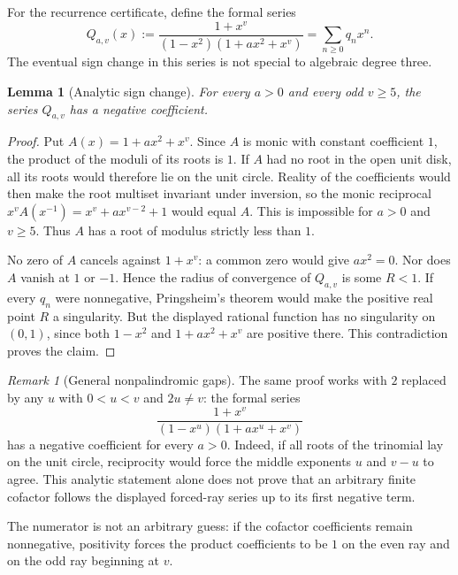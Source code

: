 \documentclass[11pt]{article}
\newtheorem{lemma}[theorem]{Lemma}
\theoremstyle{remark}
\newtheorem{remark}[theorem]{Remark}
\numberwithin{equation}{section}
\begin{document}
For the recurrence certificate, define the formal series
\begin{equation}\label{eq:forcedseries}
 Q_{a,v}(x):=\frac{1+x^v}{(1-x^2)(1+a x^2+x^v)}
             =\sum_{n\ge0}q_nx^n.
\end{equation}
The eventual sign change in this series is not special to algebraic degree
three.
\begin{lemma}[Analytic sign change]\label{lem:pringsheim}
For every $a>0$ and every odd $v\ge5$, the series $Q_{a,v}$ has a negative
coefficient.
\end{lemma}
\begin{proof}
Put $A(x)=1+ax^2+x^v$.  Since $A$ is monic with constant coefficient $1$,
the product of the moduli of its roots is $1$.  If $A$ had no root in the open
unit disk, all its roots would therefore lie on the unit circle.  Reality of
the coefficients would then make the root multiset invariant under inversion,
so the monic reciprocal $x^vA(x^{-1})=x^v+ax^{v-2}+1$ would equal $A$.
This is impossible for $a>0$ and $v\ge5$.  Thus $A$ has a root of modulus
strictly less than $1$.

No zero of $A$ cancels against $1+x^v$: a common zero would give $ax^2=0$.
Nor does $A$ vanish at $1$ or $-1$.  Hence the radius of convergence of
$Q_{a,v}$ is some $R<1$.  If every $q_n$ were nonnegative, Pringsheim's
theorem would make the positive real point $R$ a singularity.  But the
displayed rational function has no singularity on $(0,1)$, since both
$1-x^2$ and $1+ax^2+x^v$ are positive there.  This contradiction proves the
claim.
\end{proof}
\begin{remark}[General nonpalindromic gaps]\label{rem:generalpringsheim}
The same proof works with $2$ replaced by any $u$ with $0<u<v$ and $2u\ne v$:
the formal series
\[
 \frac{1+x^v}{(1-x^u)(1+a x^u+x^v)}
\]
has a negative coefficient for every $a>0$.  Indeed, if all roots of the
trinomial lay on the unit circle, reciprocity would force the middle exponents
$u$ and $v-u$ to agree.  This analytic statement alone does not prove that an
arbitrary finite cofactor follows the displayed forced-ray series up to its
first negative term.
\end{remark}

The numerator is not an arbitrary guess: if the cofactor coefficients remain
nonnegative, positivity forces the product coefficients to be $1$ on the even
ray and on the odd ray beginning at $v$.
\end{document}
